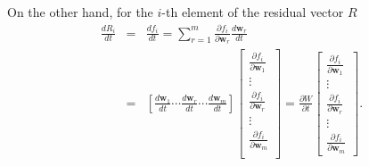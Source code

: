 \documentclass[letterpaper,12pt]{article}
\begin{document}
On the other hand, for the $i$-th element of the residual vector $R$
\begin{eqnarray}
 \frac{dR_{i}}{dt}&=&\frac{d f_{i}}{dt
 } = \sum_{r=1}^{m} \frac{\partial f_{i}}{\partial \mathbf{w}_{r}} \frac{d \mathbf{w}_{r}}{d t}\\
&=&\left[\frac{d \mathbf{w}_{1}}{d t} \cdots \frac{d \mathbf{w}_{r}}{d t} \cdots \frac{d \mathbf{w}_{m}}{d t}\right]\left[\begin{array}{c}
\frac{\partial f_{i}}{\partial \mathbf{w}_{1}} \\
\vdots\\
\frac{\partial f_{i}}{\partial \mathbf{w}_{r}} \\
\vdots\\
\frac{\partial f_{i}}{\partial \mathbf{w}_{m}}\\
\end{array}\right] = \frac{\partial W}{\partial t}\left[\begin{array}{c}
\frac{\partial f_{i}}{\partial \mathbf{w}_{1}} \\
\vdots \\
\frac{\partial f_{i}}{\partial \mathbf{w}_{r}} \\
\vdots\\
\frac{\partial f_{i}}{\partial \mathbf{w}_{m}}
\end{array}\right].
\end{eqnarray}
\end{document}
